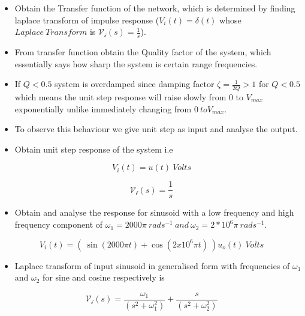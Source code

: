 \documentclass[10pt,a4paper]{article}
\providecommand{\tightlist}{%
      \setlength{\itemsep}{0pt}\setlength{\parskip}{0pt}}
\begin{document}
\begin{itemize}
\item
  Obtain the Transfer function of the network, which is determined by
  finding laplace transform of impulse response
  (\(V_{i}(t) = \delta (t)\) whose \(Laplace \ Transform\) is
  \(\mathcal{V_i}(s) = \frac{1}{s}\)).
\item
  From transfer function obtain the Quality factor of the system, which
  essentially says how sharp the system is certain range frequencies.
\item
  If \(Q < 0.5\) system is overdamped since damping factor
  \(\zeta = \frac{1}{2Q} > 1\) for \(Q<0.5\) which means the unit step
  response will raise slowly from 0 to \(V_{max}\) exponentially unlike
  immediately changing from \(0 \ to V_{max}\).
\item
  To observe this behaviour we give unit step as input and analyse the
  output.
\item
  Obtain unit step response of the system i.e
\end{itemize}

\begin{equation}
V_{i}(t) = u(t) \ Volts
\end{equation}

\begin{equation}
\mathcal{V_{i}}(s) = \frac{1}{s}
\end{equation}

\begin{itemize}
\tightlist
\item
  Obtain and analyse the response for sinusoid with a low frequency and
  high frequency component of
  \(\omega_1 = 2000\pi \ rads^{-1} \ and \ \omega_2 = 2*10^{6}\pi \ rads^{-1}\).
\end{itemize}

\begin{equation}
V_{i}(t) = ( \ \sin(2000\pi t) + \cos(2x10^{6}\pi t) \ )u_{o}(t) \ Volts
\end{equation}

\begin{itemize}
\tightlist
\item
  Laplace transform of input sinusoid in generalised form with
  frequencies of \(\omega_1\) and \(\omega_2\) for sine and cosine
  respectively is
\end{itemize}

\begin{equation}
    \mathcal{V_{i}}(s) = \frac{\omega_1}{(s^2 + \omega_1^2)}+ \frac{s}{(s^2 + \omega_2^{2})}
\end{equation}
\end{document}
